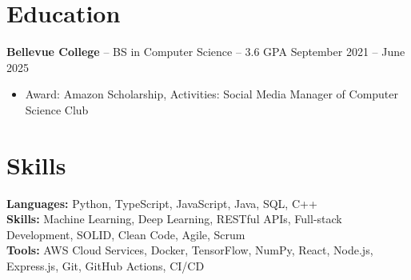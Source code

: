\documentclass[11pt]{article}       %
\begin{document}

\vspace{-18.5pt}

\section*{Education}
\textbf{Bellevue College} -- BS in Computer Science -- 3.6 GPA \hfill September 2021 -- June 2025\\
\vspace{-9pt}
\begin{itemize}
  \item Award: Amazon Scholarship, Activities: Social Media Manager of Computer Science Club
\end{itemize}

\vspace{-18.5pt}

\section*{Skills}
\textbf{Languages:} Python, TypeScript, JavaScript, Java, SQL, C++\\
\textbf{Skills:} Machine Learning, Deep Learning, RESTful APIs, Full-stack Development, SOLID, Clean Code, Agile, Scrum\\
\textbf{Tools:} AWS Cloud Services, Docker, TensorFlow, NumPy, React, Node.js, Express.js, Git, GitHub Actions, CI/CD\\

\vspace{-6.5pt}
\end{document}
